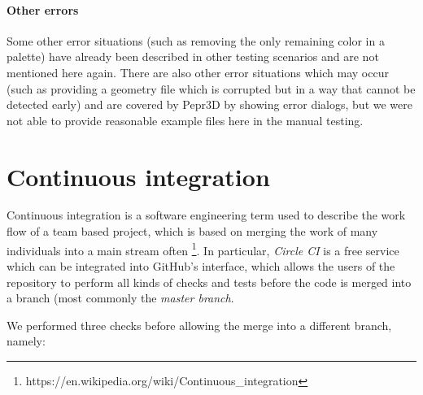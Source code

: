 \paragraph{Other errors}
Some other error situations (such as removing the only remaining color in a palette) have already been described in other testing scenarios and are not mentioned here again.
There are also other error situations which may occur (such as providing a geometry file which is corrupted but in a way that cannot be detected early) and are covered by Pepr3D by showing error dialogs, but we were not able to provide reasonable example files here in the manual testing.

\section{Continuous integration}

Continuous integration is a software engineering term used to describe the work flow of a team based project, which is based on merging the work of many individuals into a main stream often \footnote{https://en.wikipedia.org/wiki/Continuous\_integration}. In particular, \textit{Circle CI} is a free service which can be integrated into GitHub's interface, which allows the users of the repository to perform all kinds of checks and tests before the code is merged into a branch (most commonly the \textit{master branch}.

We performed three checks before allowing the merge into a different branch, namely:

